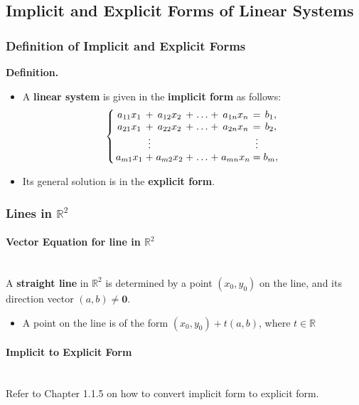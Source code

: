 \documentclass[../ma2001_notes.tex]{subfiles}
\begin{document}
\subsection{Implicit and Explicit Forms of Linear Systems}
\subsubsection{Definition of Implicit and Explicit Forms}
\textbf{Definition.}
\begin{itemize}
	\item A \textbf{linear system} is given in the \textbf{implicit form} as follows:
	\[\left\{
	\arraycolsep=1.4pt
	\begin{array}{ccccccccc}
		a_{11}x_1 & + & a_{12}x_2 & + & \ldots & + & a_{1n}x_n & = & b_1, \\
		a_{21}x_1 & + & a_{22}x_2 & + & \ldots & + & a_{2n}x_n & = & b_2, \\
		& \vdots & & & & & & \vdots & \\
		a_{m1}x_1 & + & a_{m2}x_2 & + & \ldots & + & a_{mn}x_n & = & b_m,
	\end{array}\right.
	\]
	\item Its general solution is in the \textbf{explicit form}.
\end{itemize}

\subsubsection{Lines in $\mathbb{R}^2$}
\paragraph{Vector Equation for line in $\mathbb{R}^2$}\,\\
A \textbf{straight line} in \(\mathbb{R}^2\) is determined by a point \((x_0,y_0)\) on the line, and its direction vector \((a,b)\ne\bm{0}\).
\begin{itemize}
	\item A point on the line is of the form \((x_0,y_0)+t(a,b)\), where \(t\in\mathbb{R}\)
\end{itemize}


\paragraph{Implicit to Explicit Form}\,\\
Refer to Chapter 1.1.5 on how to convert implicit form to explicit form.
\end{document}
